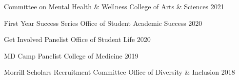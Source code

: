 

\begin{cvhonors}

  \cvhonor
    {Committee on Mental Health \& Wellness} %
    {College of Arts \& Sciences} %
    {} %
    {2021} %

  \cvhonor
    {First Year Success Series} %
    {Office of Student Academic Success} %
    {} %
    {2020} %
    
  \cvhonor
    {Get Involved Panelist} %
    {Office of Student Life} %
    {} %
    {2020} %
    
  \cvhonor
    {MD Camp Panelist} %
    {College of Medicine} %
    {} %
    {2019} %
    
  \cvhonor
    {Morrill Scholars Recruitment Committee} %
    {Office of Diversity \& Inclusion} %
    {} %
    {2018} %

\end{cvhonors}
